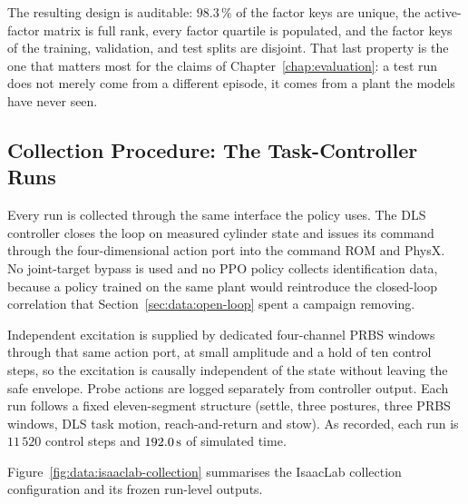 The resulting design is auditable: $98.3\,\%$ of the factor keys are
unique, the active-factor matrix is full rank, every factor quartile is
populated, and the factor keys of the training, validation, and test
splits are disjoint. That last property is the one that matters most for
the claims of Chapter~\ref{chap:evaluation}: a test run does not merely
come from a different episode, it comes from a plant the models have
never seen.

\subsection{Collection Procedure: The Task-Controller Runs}

Every run is collected through the same interface the policy uses. The DLS
controller closes the loop on measured cylinder state and issues its command
through the four-dimensional action port into the command ROM and PhysX. No
joint-target bypass is used and no PPO policy collects identification data,
because a policy trained on the same plant would reintroduce the closed-loop
correlation that Section~\ref{sec:data:open-loop} spent a campaign removing.

Independent excitation is supplied by dedicated four-channel PRBS windows
through that same action port, at small amplitude and a hold of ten control
steps, so the excitation is causally independent of the state without leaving
the safe envelope. Probe actions are logged separately from controller output.
Each run follows a fixed eleven-segment structure (settle, three postures, three
PRBS windows, DLS task motion, reach-and-return and stow). As recorded, each
run is $11\,520$ control steps and $\unit[192.0]{s}$ of simulated time.

Figure~\ref{fig:data:isaaclab-collection} summarises the IsaacLab collection
configuration and its frozen run-level outputs.

